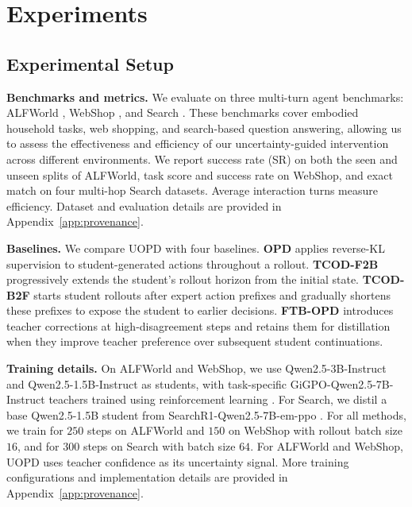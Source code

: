 \section{Experiments}
\label{sec:experiments}

\subsection{Experimental Setup}
\label{subsec:exp-setup}

\noindent\textbf{Benchmarks and metrics.} We evaluate on three multi-turn agent benchmarks: ALFWorld \citep{shridhar2021alfworld},
WebShop \citep{yao2022webshop}, and Search \citep{jin2025searchr1}. These benchmarks cover embodied household tasks, web shopping, and search-based question answering, allowing us to assess the effectiveness and efficiency of our uncertainty-guided intervention across different environments. We report success rate (SR) on both the seen and unseen splits of ALFWorld, task score and success rate on WebShop, and exact match on four multi-hop Search datasets. Average interaction turns measure efficiency.
Dataset and evaluation details are provided in Appendix~\ref{app:provenance}.

\noindent\textbf{Baselines.} We compare UOPD with four baselines.
\textbf{OPD} \citep{agarwal2024policy,lu2025onpolicydistillation} applies reverse-KL supervision to student-generated actions throughout a rollout.
\textbf{TCOD-F2B} \citep{wang2026exploring} progressively extends the student's rollout horizon from the initial state.
\textbf{TCOD-B2F} \citep{wang2026exploring} starts student rollouts after expert action prefixes and gradually shortens these prefixes to expose the student to earlier decisions.
\textbf{FTB-OPD} \citep{futurebridgeopd2026} introduces teacher corrections at high-disagreement steps and retains them for distillation when they improve teacher preference over subsequent student continuations.

\noindent\textbf{Training details.} On ALFWorld and WebShop, we use Qwen2.5-3B-Instruct and Qwen2.5-1.5B-Instruct \citep{yang2024qwen25} as
students, with task-specific GiGPO-Qwen2.5-7B-Instruct teachers trained
using reinforcement learning  \citep{feng2025gigpo}.
For Search, we distil a base Qwen2.5-1.5B student from
SearchR1-Qwen2.5-7B-em-ppo \citep{jin2025searchr1}. For all methods, we train for $250$ steps on ALFWorld and $150$ on WebShop with
rollout batch size $16$, and for $300$ steps on Search with batch size $64$. For ALFWorld and WebShop, UOPD uses teacher confidence as its uncertainty signal. More training configurations and implementation details are provided in Appendix~\ref{app:provenance}.

